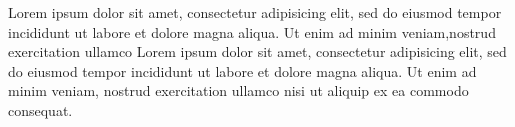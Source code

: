 \documentclass{book}
\begin{document}
\makeatletter


\begin{pages}


\begin{Leftside}
\beginnumbering
\pstart
\begin{ledgroup}
{

Lorem ipsum dolor sit amet, consectetur adipisicing elit, sed do eiusmod tempor incididunt ut labore et dolore magna aliqua. Ut enim ad minim veniam,nostrud exercitation ullamco  
Lorem ipsum dolor sit amet, consectetur adipisicing elit, sed do eiusmod tempor incididunt ut labore et dolore magna aliqua. Ut enim ad minim veniam, nostrud exercitation ullamco  nisi ut aliquip ex ea commodo consequat.}
\end{ledgroup}
\pend



\end{Leftside}
\end{pages}
\end{document}
